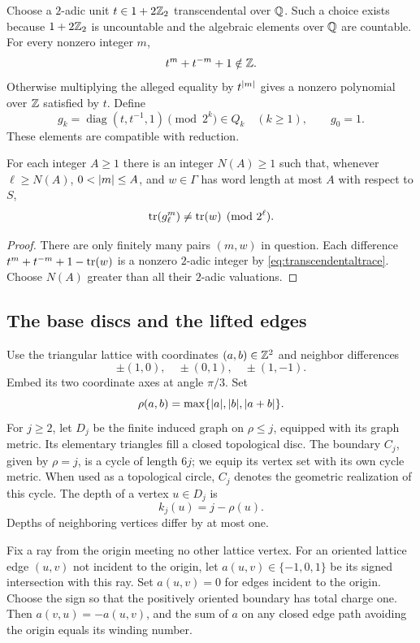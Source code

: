 Choose a $2$-adic unit $t\in1+2\mathbb Z_2$ transcendental over $\mathbb Q$. Such a choice
exists because $1+2\mathbb Z_2$ is uncountable and the algebraic elements over
$\mathbb Q$ are countable. For every nonzero integer $m$,
\begin{equation}\label{eq:transcendentaltrace}
 t^m+t^{-m}+1\notin\mathbb Z.
\end{equation}
Otherwise multiplying the alleged equality by $t^{\lvert m\rvert}$ gives a nonzero
polynomial over $\mathbb Z$ satisfied by $t$.
Define
\[
 g_k=\operatorname{diag}(t,t^{-1},1)\pmod{2^k}\in Q_k\quad(k\ge1),
 \qquad g_0=1.
\]
These elements are compatible with reduction.

\begin{lemma}\label{lem:trace}
For each integer $A\ge1$ there is an integer $N(A)\ge1$ such that, whenever
$\ell\ge N(A)$, $0<\lvert m\rvert\le A$, and $w\in\Gamma$ has word length at most
$A$ with respect to $S$,
\[
 \operatorname{tr}(g_\ell^m)\ne\operatorname{tr}(w)\pmod{2^\ell}.
\]
\end{lemma}
\begin{proof}
There are only finitely many pairs $(m,w)$ in question. Each difference
$t^m+t^{-m}+1-\operatorname{tr}(w)$ is a nonzero $2$-adic integer by
\eqref{eq:transcendentaltrace}. Choose $N(A)$ greater than all their
$2$-adic valuations.
\end{proof}

\subsection{The base discs and the lifted edges}
Use the triangular lattice with coordinates $(a,b)\in\mathbb Z^2$ and neighbor
differences
\[
 \pm(1,0),\quad\pm(0,1),\quad\pm(1,-1).
\]
Embed its two coordinate axes at angle $\pi/3$. Set
\[
 \rho(a,b)=\max\{\lvert a\rvert,\lvert b\rvert,\lvert a+b\rvert\}.
\]
For $j\ge2$, let $D_j$ be the finite induced graph on $\rho\le j$,
equipped with its graph metric. Its elementary triangles fill a closed
topological disc. The boundary $C_j$, given by $\rho=j$, is a cycle of
length $6j$; we equip its vertex set with its own cycle metric. When used as a
topological circle, $C_j$ denotes the geometric realization of this cycle.
The depth of a vertex
$u\in D_j$ is
\[
 k_j(u)=j-\rho(u).
\]
Depths of neighboring vertices differ by at most one.

Fix a ray from the origin meeting no other lattice vertex. For an oriented
lattice edge $(u,v)$ not incident to the origin, let $a(u,v)\in\{-1,0,1\}$
be its signed intersection with this ray. Set $a(u,v)=0$ for edges incident
to the origin. Choose the sign so that the positively oriented boundary
has total charge one. Then $a(v,u)=-a(u,v)$, and the sum of $a$ on any
closed edge path avoiding the origin equals its winding number.

